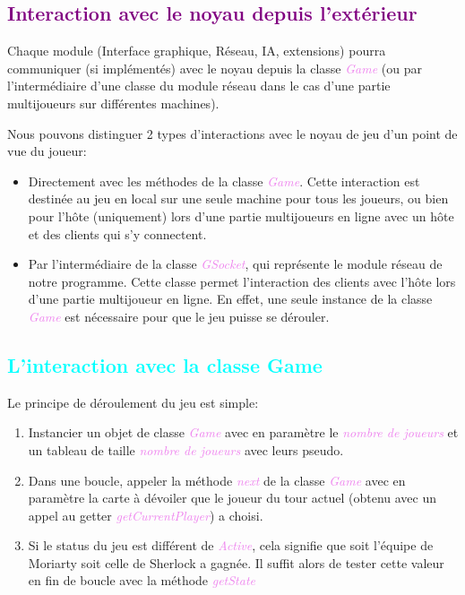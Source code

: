 \documentclass[a4paper]{article}
\let\oldsection\section
\renewcommand{\section}[1]{\textcolor{purple}{\oldsection{#1}}}
\let\oldsubsection\subsection
\renewcommand{\subsection}[1]{\textcolor{cyan}{\oldsubsection{#1}}}
\let\oldtextit\textit
\renewcommand{\textit}[1]{\textcolor{violet}{\oldtextit{#1}}}
\begin{document}
\section{Interaction avec le noyau depuis l'extérieur}

Chaque module (Interface graphique, Réseau, IA, extensions) pourra communiquer (si implémentés) avec le noyau depuis la classe \textit{Game} (ou par l'intermédiaire d'une classe du module réseau dans le cas d'une partie multijoueurs sur différentes machines).

Nous pouvons distinguer 2 types d'interactions avec le noyau de jeu d'un point de vue du joueur:
\begin{itemize}
    \item Directement avec les méthodes de la classe \textit{Game}. Cette interaction est destinée au jeu en local sur une seule machine pour tous les joueurs, ou bien pour l'hôte (uniquement) lors d'une partie multijoueurs en ligne avec un hôte et des clients qui s'y connectent.
    \item Par l'intermédiaire de la classe \textit{GSocket}, qui représente le module réseau de notre programme. Cette classe permet l'interaction des clients avec l'hôte lors d'une partie multijoueur en ligne. En effet, une seule instance de la classe \textit{Game} est nécessaire pour que le jeu puisse se dérouler.
\end{itemize}

\subsection{L'interaction avec la classe Game}

Le principe de déroulement du jeu est simple:
\begin{enumerate}
    \item Instancier un objet de classe \textit{Game} avec en paramètre le \textit{nombre de joueurs} et un tableau de taille \textit{nombre de joueurs} avec leurs pseudo.
    \item Dans une boucle, appeler la méthode \textit{next} de la classe \textit{Game} avec en paramètre la carte à dévoiler que le joueur du tour actuel (obtenu avec un appel au getter \textit{getCurrentPlayer}) a choisi.
    \item Si le status du jeu est différent de \textit{Active}, cela signifie que soit l'équipe de Moriarty soit celle de Sherlock a gagnée. Il suffit alors de tester cette valeur en fin de boucle avec la méthode \textit{getState}
\end{enumerate}
\end{document}
